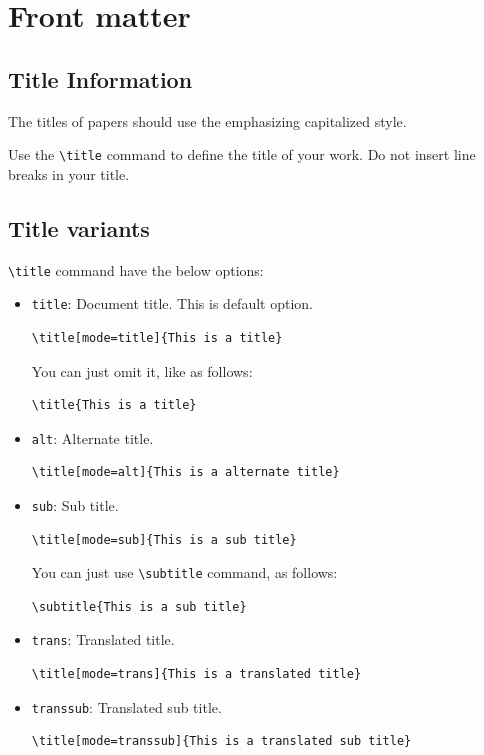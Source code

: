 \documentclass{ceurart}
\begin{document}
\section{Front matter}

\subsection{Title Information}

The titles of papers should use the emphasizing
capitalized style.

Use the \verb|\title| command to define the title of your work. Do not
insert line breaks in your title.

\subsection{Title variants}

\verb|\title| command have the below options:
\begin{itemize}
\item \verb|title|: Document title. This is default option. 
\begin{lstlisting}
\title[mode=title]{This is a title}
\end{lstlisting}
You can just omit it, like as follows:
\begin{lstlisting}
\title{This is a title}
\end{lstlisting}

\item \verb|alt|: Alternate title.
\begin{lstlisting}
\title[mode=alt]{This is a alternate title}
\end{lstlisting}

\item \verb|sub|: Sub title.
\begin{lstlisting}
\title[mode=sub]{This is a sub title}
\end{lstlisting}
You can just use \verb|\subtitle| command, as follows:
\begin{lstlisting}
\subtitle{This is a sub title}
\end{lstlisting}

\item \verb|trans|: Translated title.
\begin{lstlisting}
\title[mode=trans]{This is a translated title}
\end{lstlisting}

\item \verb|transsub|: Translated sub title.
\begin{lstlisting}
\title[mode=transsub]{This is a translated sub title}
\end{lstlisting}
\end{itemize}
\end{document}
